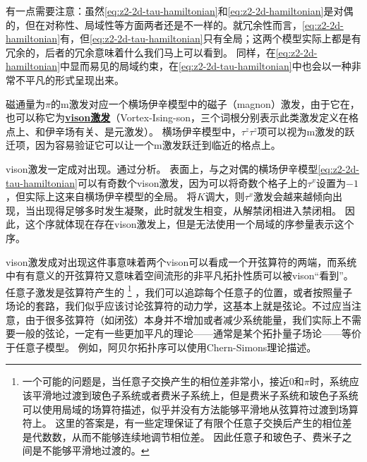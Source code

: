 \documentclass[hyperref, UTF8, a4paper]{ctexart}
\newcommand*{\concept}[1]{\underline{\textbf{#1}}}
\newcommand*{\Ztwo}{$\mathbb{Z}_2$}
\begin{document}
有一点需要注意：虽然\eqref{eq:z2-2d-tau-hamiltonian}和\eqref{eq:z2-2d-hamiltonian}是对偶的，但在对称性、局域性等方面两者还是不一样的。就冗余性而言，\eqref{eq:z2-2d-hamiltonian}有，但\eqref{eq:z2-2d-tau-hamiltonian}只有全局；这两个模型实际上都是有冗余的，后者的冗余意味着什么我们马上可以看到。
同样，在\eqref{eq:z2-2d-hamiltonian}中显而易见的局域约束，在\eqref{eq:z2-2d-tau-hamiltonian}中也会以一种非常不平凡的形式呈现出来。


磁通量为$\pi$的m激发对应一个横场伊辛模型中的磁子（magnon）激发，由于它在，也可以称它为\concept{vison激发}（Vortex-Ising-son，三个词根分别表示此类激发定义在格点上、和伊辛场有关、是元激发）。
横场伊辛模型中，$\tau^z \tau^z$项可以视为m激发的跃迁项，因为容易验证它可以让一个m激发跃迁到临近的格点上。

vison激发一定成对出现。通过分析。
表面上，与之对偶的横场伊辛模型\eqref{eq:z2-2d-tau-hamiltonian}可以有奇数个vison激发，因为可以将奇数个格子上的$\tau^x$设置为$-1$，但实际上这来自横场伊辛模型的全局。
将$K$调大，则$\tau^x$激发会越来越倾向出现，当出现得足够多时发生凝聚，此时就发生相变，从解禁闭相进入禁闭相。
因此，这个序就体现在存在vison激发上，但是无法使用一个局域的序参量表示这个序。

vison激发成对出现这件事意味着两个vison可以看成一个开弦算符的两端，而系统中有有意义的开弦算符又意味着空间流形的非平凡拓扑性质可以被vison“看到”。
任意子激发是弦算符产生的%
\footnote{
    一个可能的问题是，当任意子交换产生的相位差非常小，接近$0$和$\pi$时，系统应该平滑地过渡到玻色子系统或者费米子系统上，但是费米子系统和玻色子系统可以使用局域的场算符描述，似乎并没有方法能够平滑地从弦算符过渡到场算符上。
    这里的答案是，有一些定理保证了有限个任意子交换后产生的相位差是代数数，从而不能够连续地调节相位差。
    因此任意子和玻色子、费米子之间是不能够平滑地过渡的。
}%
，我们可以追踪每个任意子的位置，或者按照量子场论的套路，我们似乎应该讨论弦算符的动力学，这基本上就是弦论。不过应当注意，由于很多弦算符（如闭弦）本身并不增加或者减少系统能量，我们实际上不需要一般的弦论，一定有一些更加平凡的理论——通常是某个拓扑量子场论——等价于任意子模型。
例如，阿贝尔拓扑序可以使用Chern-Simons理论描述。
\end{document}
